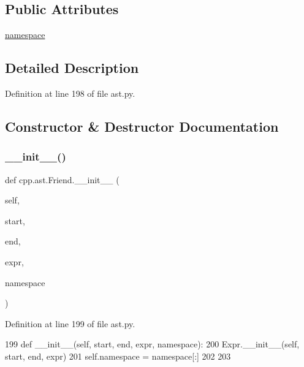 \subsection*{Public Attributes}
\begin{DoxyCompactItemize}
\item 
\hyperlink{classcpp_1_1ast_1_1Friend_a076c68dddae9bd1e24d224d005538014}{namespace}
\end{DoxyCompactItemize}


\subsection{Detailed Description}


Definition at line 198 of file ast.\+py.



\subsection{Constructor \& Destructor Documentation}
\mbox{\label{classcpp_1_1ast_1_1Friend_a9fe245d0f14eaab85435e942a56de7e6}} 
\subsubsection{\texorpdfstring{\+\_\+\+\_\+init\+\_\+\+\_\+()}{\_\_init\_\_()}}
{\footnotesize\ttfamily def cpp.\+ast.\+Friend.\+\_\+\+\_\+init\+\_\+\+\_\+ (\begin{DoxyParamCaption}\item[{}]{self,  }\item[{}]{start,  }\item[{}]{end,  }\item[{}]{expr,  }\item[{}]{namespace }\end{DoxyParamCaption})}



Definition at line 199 of file ast.\+py.


\begin{DoxyCode}
199     \textcolor{keyword}{def }\_\_init\_\_(self, start, end, expr, namespace):
200         Expr.\_\_init\_\_(self, start, end, expr)
201         self.namespace = namespace[:]
202 
203 
\end{DoxyCode}


